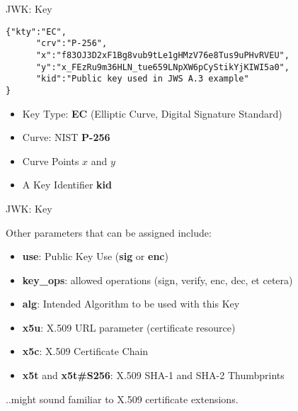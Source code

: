 \begin{frame}[fragile]{JWK: Key}

\begin{verbatim}
{"kty":"EC",
      "crv":"P-256",
      "x":"f83OJ3D2xF1Bg8vub9tLe1gHMzV76e8Tus9uPHvRVEU",
      "y":"x_FEzRu9m36HLN_tue659LNpXW6pCyStikYjKIWI5a0",
      "kid":"Public key used in JWS A.3 example"
}
\end{verbatim}

\begin{itemize}
\itemsep1pt\parskip0pt
\item
  Key Type: \textbf{EC} (Elliptic Curve, Digital Signature Standard)
\item
  Curve: NIST \textbf{P-256}
\item
  Curve Points \(x\) and \(y\)
\item
  A Key Identifier \textbf{kid}
\end{itemize}

\end{frame}

\begin{frame}{JWK: Key}

Other parameters that can be assigned include:

\begin{itemize}
\itemsep1pt\parskip0pt
\item
  \textbf{use}: Public Key Use (\textbf{sig} or \textbf{enc})
\item
  \textbf{key\_ops}: allowed operations (sign, verify, enc, dec, et
  cetera)
\item
  \textbf{alg}: Intended Algorithm to be used with this Key
\item
  \textbf{x5u}: X.509 URL parameter (certificate resource)
\item
  \textbf{x5c}: X.509 Certificate Chain
\item
  \textbf{x5t} and \textbf{x5t\#S256}: X.509 SHA-1 and SHA-2 Thumbprints
\end{itemize}

..might sound familiar to X.509 certificate extensions.

\end{frame}

